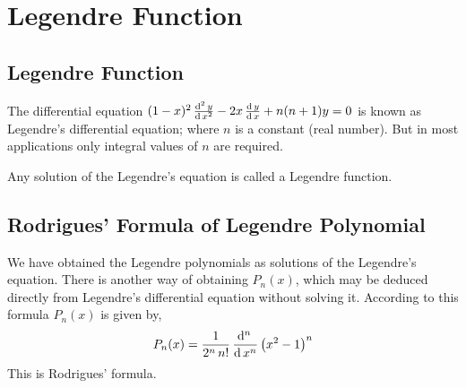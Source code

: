 \documentclass[../main-sheet.tex]{subfiles}
\begin{document}
\chapter{Legendre Function}
\section{Legendre Function}
The differential equation $ (1-x)^2\,\frac{\mathrm{d}^{2}\, y}{\mathrm{d}\, x^{2}}-2x\,\frac{\mathrm{d}\,y}{\mathrm{d}\,x}+n(n+1)y=0 $ is known as Legendre's differential equation; where $ n $ is a constant (real number). But in most applications only integral values of $ n $ are required.

Any solution of the Legendre's equation is called a Legendre function.

\section{Rodrigues' Formula of Legendre Polynomial}
We have obtained the Legendre polynomials as solutions of the Legendre's equation. There is another way of obtaining $ P_n(x) $, which may be deduced directly from Legendre's differential equation without solving it. According  to this formula $ P_n(x) $ is given by,
\[
    P_n(x)=\frac{1}{2^n\,n!}\,\frac{\mathrm{d}^{n}\, }{\mathrm{d}\, x^{n}}\left(x^2-1\right)^n
\]
This is Rodrigues' formula.
\end{document}
